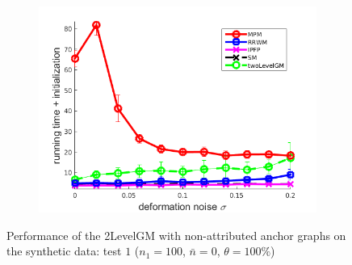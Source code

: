 \begin{figure}
\begin{subfigure}[b]{0.33\textwidth}
	\end{subfigure} 
	\begin{subfigure}[b]{0.32\textwidth}
		\centering
		\includegraphics[scale=0.25]{"chapter3/fig/SyntheticTest/no_descr/Results_v4.3.3/Test2/time_summary_avg10t"} 
	\end{subfigure} 
	\caption[Performance of the 2LevelGM with non-attributed anchor graphs on the synthetic data (test $1$)]{Performance of the 2LevelGM with non-attributed anchor graphs on the synthetic data: test $1$ ($n_1=100$, $\bar{n}=0$, $\theta=100\%$)}
	\label{fig:synTest1_ver433}
\end{figure}
